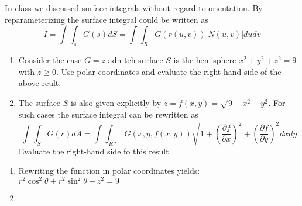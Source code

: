 In class we discussed surface integrals without regard to orientation. By reparameterizing the surface integral could be written as 
\begin{equation*}
I=\int \int_s G\left(s\right)dS=\int \int_R G\left(r\left(u,v\right)\right)\vert N\left(u,v\right)\vert dudv
\end{equation*}

\begin{enumerate}
	\item Consider the case $G=z$ adn teh surface $S$ is the hemisphere $x^2+y^2+z^2=9$ with $z\geq0$. Use polar coordinates and evaluate the right hand side of the above reult. 
	\item The surface $S$ is also given explicitly by $z=f\left(x,y\right)=\sqrt{9-x^2-y^2}$. For such cases the surface integral can be rewritten as 
	\begin{equation}
		\int \int_S G\left(r\right)dA=\int \int_{R*} G(x,y,f(x,y))\sqrt{1+\left(\frac{\partial f}{\partial x}\right)^2+\left(\frac{\partial f}{\partial y}\right)^2}dxdy
		\end{equation}
		Evaluate the right-hand side fo this result.
		
\end{enumerate}

\begin{enumerate}
	\item Rewriting the function in polar coordinates yields: $r^2\cos^2\theta+r^2\sin^2\theta+z^2=9$

	\item 
\end{enumerate}
			